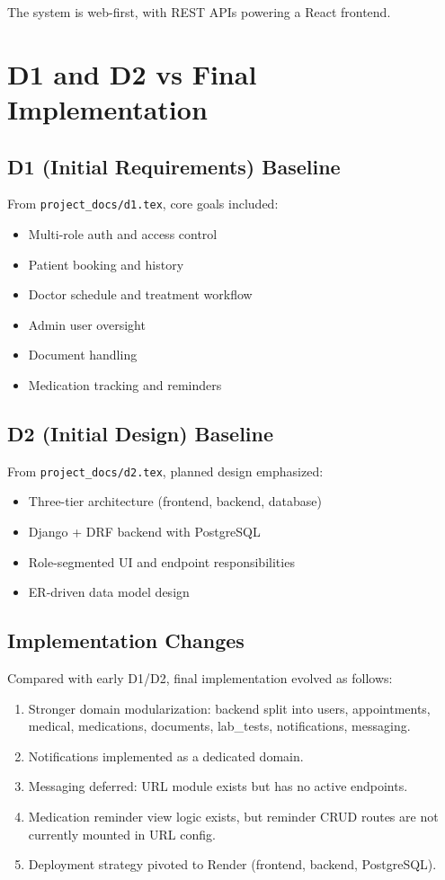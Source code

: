 \documentclass[12pt,a4paper]{article}
\begin{document}
The system is web-first, with REST APIs powering a React frontend.

\section{D1 and D2 vs Final Implementation}

\subsection{D1 (Initial Requirements) Baseline}

From \texttt{project\_docs/d1.tex}, core goals included:
\begin{itemize}
  \item Multi-role auth and access control
  \item Patient booking and history
  \item Doctor schedule and treatment workflow
  \item Admin user oversight
  \item Document handling
  \item Medication tracking and reminders
\end{itemize}

\subsection{D2 (Initial Design) Baseline}

From \texttt{project\_docs/d2.tex}, planned design emphasized:
\begin{itemize}
  \item Three-tier architecture (frontend, backend, database)
  \item Django + DRF backend with PostgreSQL
  \item Role-segmented UI and endpoint responsibilities
  \item ER-driven data model design
\end{itemize}

\subsection{Implementation Changes}

Compared with early D1/D2, final implementation evolved as follows:
\begin{enumerate}
  \item Stronger domain modularization: backend split into users, appointments, medical, medications, documents, lab\_tests, notifications, messaging.
  \item Notifications implemented as a dedicated domain.
  \item Messaging deferred: URL module exists but has no active endpoints.
  \item Medication reminder view logic exists, but reminder CRUD routes are not currently mounted in URL config.
  \item Deployment strategy pivoted to Render (frontend, backend, PostgreSQL).
\end{enumerate}
\end{document}
